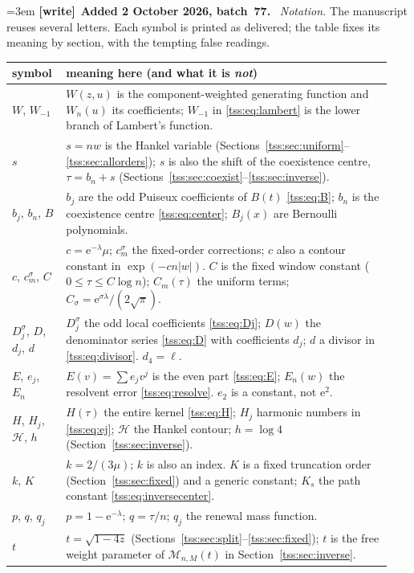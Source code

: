 \documentclass[11pt]{article}
\theoremstyle{remark}\newtheorem{remark}[theorem]{Remark}
\theoremstyle{definition}\newtheorem{definition}[theorem]{Definition}
\newcommand{\e}{\mathrm e}
\newenvironment{writenote}[1][]{\par\smallskip\begingroup\small\emergencystretch=3em
 \noindent\textbf{[write]}\if\relax\detokenize{#1}\relax\else~\textbf{#1.}\fi\ }%
 {\par\endgroup\smallskip}
\begin{document}
\begin{writenote}[Added 2 October 2026, batch~77]
\emph{Notation.} The manuscript reuses several letters. Each symbol is printed
as delivered; the table fixes its meaning by section, with the tempting false
readings.
\begin{center}\footnotesize
\begin{tabular}{@{}>{\raggedright\arraybackslash}p{0.13\linewidth}>{\raggedright\arraybackslash}p{0.81\linewidth}@{}}
\toprule
symbol & meaning here (and what it is \emph{not})\\
\midrule
$W$, $W_{-1}$ & $W(z,u)$ is the component-weighted generating function and $W_n(u)$ its coefficients; $W_{-1}$ in \eqref{tss:eq:lambert} is the lower branch of Lambert's function.\\
$s$ & $s=nw$ is the Hankel variable (Sections~\ref{tss:sec:uniform}--\ref{tss:sec:allorders}); $s$ is also the shift of the coexistence centre, $\tau=b_n+s$ (Sections~\ref{tss:sec:coexist}--\ref{tss:sec:inverse}).\\
$b_j$, $b_n$, $B$ & $b_j$ are the odd Puiseux coefficients of $B(t)$ \eqref{tss:eq:B}; $b_n$ is the coexistence centre \eqref{tss:eq:center}; $B_j(x)$ are Bernoulli polynomials.\\
$c$, $c_m^\sigma$, $C$ & $c=\e^{-\lambda}\mu$; $c_m^\sigma$ the fixed-order corrections; $c$ also a contour constant in $\exp(-cn|w|)$. $C$ is the fixed window constant ($0\le\tau\le C\log n$); $C_m(\tau)$ the uniform terms; $C_\sigma=\e^{\sigma\lambda}/(2\sqrt\pi)$.\\
$D_j^\sigma$, $D$, $d_j$, $d$ & $D_j^\sigma$ the odd local coefficients \eqref{tss:eq:Dj}; $D(w)$ the denominator series \eqref{tss:eq:D} with coefficients $d_j$; $d$ a divisor in \eqref{tss:eq:divisor}. $d_4=\ell$.\\
$E$, $e_j$, $E_n$ & $E(v)=\sum e_jv^j$ is the even part \eqref{tss:eq:E}; $E_n(w)$ the resolvent error \eqref{tss:eq:resolve}. $e_2$ is a constant, not $\e^2$.\\
$H$, $H_j$, $\mathcal H$, $h$ & $H(\tau)$ the entire kernel \eqref{tss:eq:H}; $H_j$ harmonic numbers in \eqref{tss:eq:ej}; $\mathcal H$ the Hankel contour; $h=\log4$ (Section~\ref{tss:sec:inverse}).\\
$k$, $K$ & $k=2/(3\mu)$; $k$ is also an index. $K$ is a fixed truncation order (Section~\ref{tss:sec:fixed}) and a generic constant; $K_s$ the path constant \eqref{tss:eq:inversecenter}.\\
$p$, $q$, $q_j$ & $p=1-\e^{-\lambda}$; $q=\tau/n$; $q_j$ the renewal mass function.\\
$t$ & $t=\sqrt{1-4z}$ (Sections~\ref{tss:sec:split}--\ref{tss:sec:fixed}); $t$ is the free weight parameter of $\mathcal M_{n,M}(t)$ in Section~\ref{tss:sec:inverse}.\\

\end{tabular}
\end{center}
\end{writenote}
\end{document}
